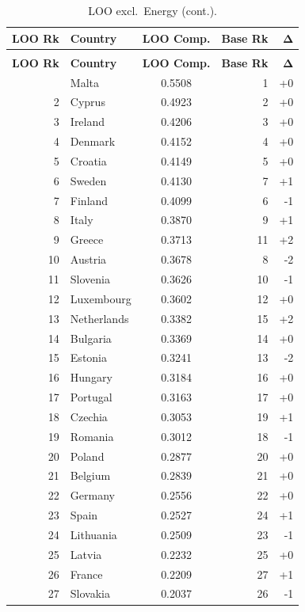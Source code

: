 \begin{longtable}{@{}rl S[table-format=1.4] r r@{}}
\caption{LOO ranking excluding Energy.  Spearman $\rho = 0.9921$, Kendall $\tau = 0.9430$.}
\label{tab:loo-energy}\\
\toprule
{\textbf{LOO Rk}} & {\textbf{Country}} & {\textbf{LOO Comp.}} & {\textbf{Base Rk}} & {$\boldsymbol{\Delta}$} \\
\midrule
\endfirsthead
\caption[]{LOO excl.\ Energy (cont.).}\\
\toprule
{\textbf{LOO Rk}} & {\textbf{Country}} & {\textbf{LOO Comp.}} & {\textbf{Base Rk}} & {$\boldsymbol{\Delta}$} \\
\midrule
\endhead
\bottomrule
{} & Malta & 0.5508 & 1 & +0 \\
  2 & Cyprus & 0.4923 & 2 & +0 \\
  3 & Ireland & 0.4206 & 3 & +0 \\
  4 & Denmark & 0.4152 & 4 & +0 \\
  5 & Croatia & 0.4149 & 5 & +0 \\
  6 & Sweden & 0.4130 & 7 & +1 \\
  7 & Finland & 0.4099 & 6 & -1 \\
  8 & Italy & 0.3870 & 9 & +1 \\
  9 & Greece & 0.3713 & 11 & +2 \\
  10 & Austria & 0.3678 & 8 & -2 \\
  11 & Slovenia & 0.3626 & 10 & -1 \\
  12 & Luxembourg & 0.3602 & 12 & +0 \\
  13 & Netherlands & 0.3382 & 15 & +2 \\
  14 & Bulgaria & 0.3369 & 14 & +0 \\
  15 & Estonia & 0.3241 & 13 & -2 \\
  16 & Hungary & 0.3184 & 16 & +0 \\
  17 & Portugal & 0.3163 & 17 & +0 \\
  18 & Czechia & 0.3053 & 19 & +1 \\
  19 & Romania & 0.3012 & 18 & -1 \\
  20 & Poland & 0.2877 & 20 & +0 \\
  21 & Belgium & 0.2839 & 21 & +0 \\
  22 & Germany & 0.2556 & 22 & +0 \\
  23 & Spain & 0.2527 & 24 & +1 \\
  24 & Lithuania & 0.2509 & 23 & -1 \\
  25 & Latvia & 0.2232 & 25 & +0 \\
  26 & France & 0.2209 & 27 & +1 \\
  27 & Slovakia & 0.2037 & 26 & -1 \\
\end{longtable}